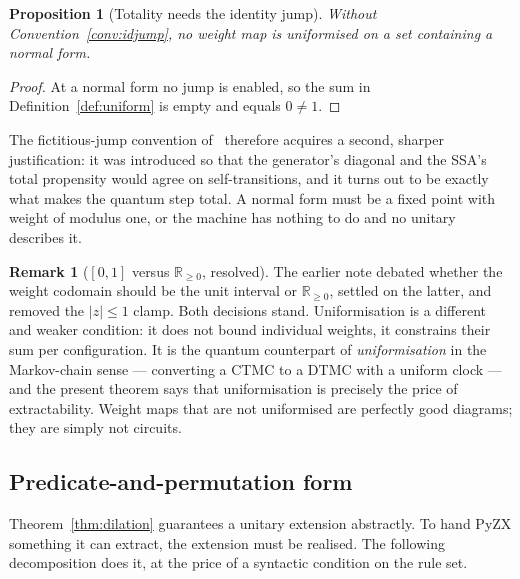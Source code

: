 \documentclass[11pt]{article}
\theoremstyle{definition}
\newtheorem{remark}[definition]{Remark}
\theoremstyle{plain}
\newtheorem{proposition}[definition]{Proposition}
\begin{document}
\begin{proposition}[Totality needs the identity jump]\label{prop:idneeded}
Without Convention~\ref{conv:idjump}, no weight map is uniformised on a set containing a normal
form.
\end{proposition}

\begin{proof}
At a normal form no jump is enabled, so the sum in Definition~\ref{def:uniform} is empty and
equals $0\neq 1$.
\end{proof}

The fictitious-jump convention of~\cite{weighted} therefore acquires a second, sharper
justification: it was introduced so that the generator's diagonal and the SSA's total propensity
would agree on self-transitions, and it turns out to be exactly what makes the quantum step
total. A normal form must be a fixed point with weight of modulus one, or the machine has nothing
to do and no unitary describes it.

\begin{remark}[{$[0,1]$ versus $\mathbb{R}_{\geq 0}$, resolved}]\label{rem:clamp}
The earlier note debated whether the weight codomain should be the unit interval or
$\mathbb{R}_{\geq 0}$, settled on the latter, and removed the $|z|\le 1$ clamp. Both decisions
stand. Uniformisation is a different and weaker condition: it does not bound individual weights,
it constrains their sum per configuration. It is the quantum counterpart of \emph{uniformisation}
in the Markov-chain sense --- converting a CTMC to a DTMC with a uniform clock --- and the
present theorem says that uniformisation is precisely the price of extractability. Weight maps
that are not uniformised are perfectly good diagrams; they are simply not circuits.
\end{remark}

\subsection{Predicate-and-permutation form}\label{ssec:predperm}

Theorem~\ref{thm:dilation} guarantees a unitary extension abstractly. To hand PyZX something it
can extract, the extension must be realised. The following decomposition does it, at the price of
a syntactic condition on the rule set.
\end{document}

